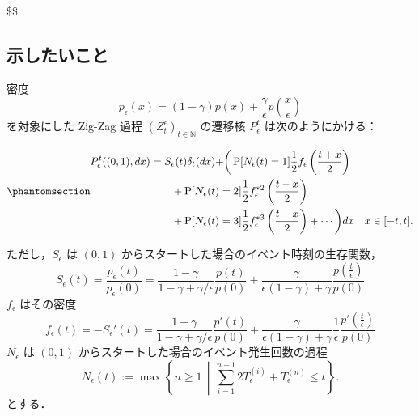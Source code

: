 \documentclass[
]{article}
\theoremstyle{StatementsWithUnderline}\newtheorem{theorem}{定理}[section]\newtheorem{definition}[theorem]{定義}\newtheorem{corollary}[theorem]{系}\newtheorem{proposition}[theorem]{命題}\newtheorem{lemma}[theorem]{補題}\newtheorem{example}[theorem]{例}
\theoremstyle{definition}\newtheorem{notation}[theorem]{記法}\newtheorem{algorithm}[theorem]{算譜}\newtheorem{remarks}[theorem]{要諦}\newtheorem{remark}[theorem]{注}
\begin{document}
\renewcommand{\iff}{\;\mathrm{iff}\;}
\newcommand{\False}{\mathrm{False}}\newcommand{\True}{\mathrm{True}}
\newcommand{\otherwise}{\mathrm{otherwise}}
\newcommand{\suchthat}{\;\mathrm{s.t.}\;}

\newcommand{\cM}{\mathcal{M}}\newcommand{\M}{\mathbb{M}}\newcommand{\cF}{\mathcal{F}}\newcommand{\cD}{\mathcal{D}}\newcommand{\fX}{\mathfrak{X}}\newcommand{\fY}{\mathfrak{Y}}\newcommand{\fZ}{\mathfrak{Z}}\renewcommand{\H}{\mathcal{H}}\newcommand{\cH}{\mathcal{H}}\newcommand{\fH}{\mathfrak{H}}\newcommand{\bH}{\mathbb{H}}\newcommand{\id}{\mathrm{id}}\newcommand{\A}{\mathcal{A}}
\newcommand{\lmd}{\lambda}
\newcommand{\Lmd}{\Lambda}
\newcommand{\cI}{\mathcal{I}}

\newcommand{\Lrarrow}{\;\;\Leftrightarrow\;\;}

\$\$

\subsection{示したいこと}\label{ux793aux3057ux305fux3044ux3053ux3068}

密度 \[
p_\epsilon(x)=(1-\gamma)p(x)+\frac{\gamma}{\epsilon}p\left(\frac{x}{\epsilon}\right)
\] を対象にした Zig-Zag 過程 \((Z^\epsilon_t)_{t\in\mathbb{N}}\)
の遷移核 \(P_\epsilon^t\) は次のようにかける：

\begin{equation}\phantomsection\label{eq-1}{
\begin{align*}
  P^t_\epsilon((0,1),dx)&=S_\epsilon(t)\delta_t(dx)+\biggr(\operatorname{P}[N_\epsilon(t)=1]\frac{1}{2}f_\epsilon\left(\frac{t+x}{2}\right)\\
  &\qquad+\operatorname{P}[N_\epsilon(t)=2]\frac{1}{2}f^{*2}_\epsilon\left(\frac{t-x}{2}\right)\\
  &\qquad+\operatorname{P}[N_\epsilon(t)=3]\frac{1}{2}f^{*3}_\epsilon\left(\frac{t+x}{2}\right)+\cdots\biggl)dx& x\in[-t,t].
\end{align*}
}\end{equation}

ただし，\(S_\epsilon\) は \((0,1)\)
からスタートした場合のイベント時刻の生存関数， \[
S_\epsilon(t)=\frac{p_\epsilon(t)}{p_\epsilon(0)}=\frac{1-\gamma}{1-\gamma+\gamma/\epsilon}\frac{p(t)}{p(0)}+\frac{\gamma}{\epsilon(1-\gamma)+\gamma}\frac{p\left(\frac{t}{\epsilon}\right)}{p(0)}
\] \(f_\epsilon\) はその密度 \[
f_\epsilon(t)=-S_\epsilon'(t)=\frac{1-\gamma}{1-\gamma+\gamma/\epsilon}\frac{p'(t)}{p(0)}+\frac{\gamma}{\epsilon(1-\gamma)+\gamma}\frac{1}{\epsilon}\frac{p'\left(\frac{t}{\epsilon}\right)}{p(0)}
\] \(N_\epsilon\) は \((0,1)\)
からスタートした場合のイベント発生回数の過程 \[
N_\epsilon(t):=\max\left\{n\ge 1\,\middle|\,\sum_{i=1}^{n-1}2T_\epsilon^{(i)}+T_\epsilon^{(n)}\le t\right\}.
\] とする．
\end{document}
